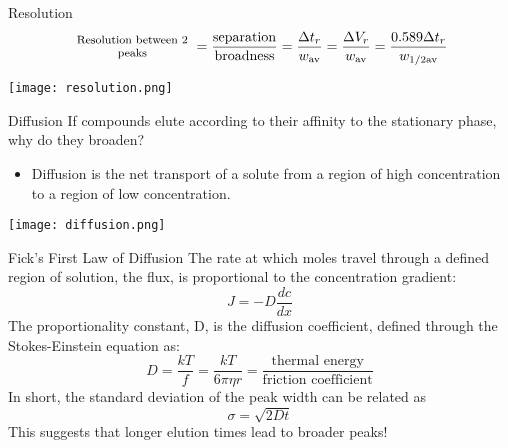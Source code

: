 \documentclass[notes=only]{beamer}
\begin{document}
\begin{frame}{Resolution}
	\begin{align*}
		\parbox{0.25\linewidth}{\centering \footnotesize Resolution
		between 2 peaks} = \frac{\text{separation}}{\text{broadness}} =
		\frac{\Delta t_r}{w_\text{av}} = \frac{\Delta V_r}{w_\text{av}}
		= \frac{0.589\Delta t_r}{w_{1/2\text{av}}}
	\end{align*}

	\begin{center}
		\texttt{[image: resolution.png]}
	\end{center}
\end{frame}


\begin{frame}{Diffusion}
	If compounds elute according to their affinity to the
	stationary phase, why do they broaden?
	\begin{itemize}
		\item \alert{Diffusion} is the net transport of a solute from a
			region of high concentration to a region of low
			concentration.
	\end{itemize}

	\begin{center}
		\texttt{[image: diffusion.png]}
	\end{center}
\end{frame}


\begin{frame}{Fick's First Law of Diffusion}
		The rate at which moles travel through a defined region of
			solution, the \alert{flux}, is proportional to the
			concentration gradient:
			\begin{equation*}
				J = -D \frac{dc}{dx}
			\end{equation*}
		The proportionality constant, D, is the \alert{diffusion
			coefficient}, defined through the Stokes-Einstein
			equation as:
			\begin{equation*}
				D = \frac{kT}{f} = \frac{kT}{6\pi\eta r} =
				\frac{\text{thermal energy}}{\text{friction
				coefficient}}
			\end{equation*}
		In short, the standard deviation of the peak width can be
			related as
			\begin{equation*}
				\sigma = \sqrt{2Dt}
			\end{equation*}
			This suggests that longer elution times lead to broader
			peaks!
\end{frame}
\end{document}

